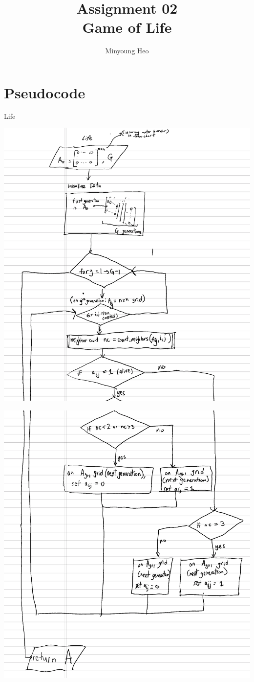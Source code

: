 \documentclass{article}
\title{Assignment 02\\ \large Game of Life}
\author{Minyoung Heo}
\begin{document}
\maketitle

\section{Pseudocode}
Life

\includegraphics[scale=0.2]{pseudocode1a.png}

\includegraphics[scale=0.2]{pseudocode1b.png}
\end{document}
